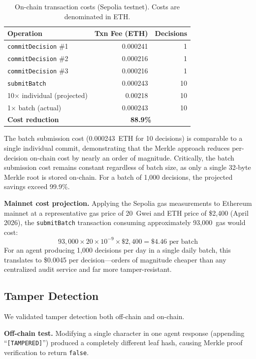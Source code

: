 \documentclass[manuscript,nonacm]{acmart}
\begin{document}
\begin{table}[t]
\centering
\caption{On-chain transaction costs (Sepolia testnet). Costs are denominated in ETH.}
\label{tab:gas}
\begin{tabular}{@{}lrr@{}}
\toprule
\textbf{Operation} & \textbf{Txn Fee (ETH)} & \textbf{Decisions} \\
\midrule
\texttt{commitDecision} \#1   & 0.000241 & 1  \\
\texttt{commitDecision} \#2   & 0.000216 & 1  \\
\texttt{commitDecision} \#3   & 0.000216 & 1  \\
\texttt{submitBatch}          & 0.000243 & 10 \\
\midrule
10$\times$ individual (projected) & 0.00218  & 10 \\
1$\times$ batch (actual)          & 0.000243 & 10 \\
\midrule
\textbf{Cost reduction}           & \multicolumn{2}{c}{\textbf{88.9\%}} \\
\bottomrule
\end{tabular}
\end{table}

The batch submission cost (0.000243~ETH for 10 decisions) is comparable to a single individual commit, demonstrating that the Merkle approach reduces per-decision on-chain cost by nearly an order of magnitude.
Critically, the batch submission cost remains constant regardless of batch size, as only a single 32-byte Merkle root is stored on-chain.
For a batch of 1,000 decisions, the projected savings exceed 99.9\%.

\textbf{Mainnet cost projection.}
Applying the Sepolia gas measurements to Ethereum mainnet at a representative gas price of 20~Gwei and ETH price of \$2,400 (April 2026), the \texttt{submitBatch} transaction consuming approximately 93,000~gas would cost:
\[
93{,}000 \times 20 \times 10^{-9} \times \$2{,}400 = \$4.46 \text{ per batch}
\]
For an agent producing 1,000 decisions per day in a single daily batch, this translates to \$0.0045 per decision---orders of magnitude cheaper than any centralized audit service and far more tamper-resistant.

\subsection{Tamper Detection}

We validated tamper detection both off-chain and on-chain.

\textbf{Off-chain test.}
Modifying a single character in one agent response (appending ``\texttt{[TAMPERED]}'') produced a completely different leaf hash, causing Merkle proof verification to return \texttt{false}.
\end{document}
